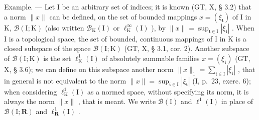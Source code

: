 Example. --- Let I be an arbitrary set of indices; it is known (GT, X, § 3.2) that a norm \(\|x\|\) can be defined, on the set of bounded mappings \(x = (\xi_{\mathfrak{t}})\) of I in K, \(\mathcal{B}(\mathrm{I};\mathrm{K})\) (also written \(\mathcal{B}_{\mathrm{K}}(\mathrm{I})\) or \(\ell_{\mathrm{K}}^{\infty}(\mathrm{I})\) ), by \(\|x\| = \sup_{\mathfrak{t}\in \mathrm{I}}|\xi_{\mathfrak{t}}|\) . When I is a topological space, the set of bounded, continuous mappings of I in K is a closed subspace of the space \(\mathcal{B}(\mathrm{I};\mathrm{K})\) (GT, X, § 3.1, cor. 2). Another subspace of \(\mathcal{B}(\mathrm{I};\mathrm{K})\) is the set \(\ell_{\mathrm{K}}^{1}(\mathrm{I})\) of absolutely summable families \(x = (\xi_{\mathfrak{t}})\) (GT, X, § 3.6); we can define on this subspace another norm \(\|x\|_1 = \sum_{\mathfrak{t}\in \mathrm{I}}|\xi_{\mathfrak{t}}|\) , that in general is not equivalent to the norm \(\|x\| = \sup_{\mathfrak{t}\in \mathrm{I}}|\xi_{\mathfrak{t}}|\) (I, p.~23, exerc. 6); when considering \(\ell_{\mathrm{K}}^{1}(\mathrm{I})\) as a normed space, without specifying its norm, it is always the norm \(\|x\|\) , that is meant. We write \(\mathcal{B}(\mathrm{I})\) and \(\ell^1 (\mathrm{I})\) in place of \(\mathcal{B}(\mathrm{I};\mathbf{R})\) and \(\ell_{\mathbf{R}}^{1}(\mathrm{I})\) .

